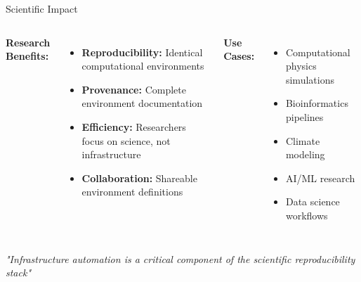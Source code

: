 \documentclass[aspectratio=169]{beamer}
\begin{document}
\begin{frame}{Scientific Impact}
  \begin{columns}
    \textbf{Research Benefits:}
    \begin{itemize}
      \item \textbf{Reproducibility:} Identical computational environments
      \item \textbf{Provenance:} Complete environment documentation
      \item \textbf{Efficiency:} Researchers focus on science, not infrastructure
      \item \textbf{Collaboration:} Shareable environment definitions
    \end{itemize}
    
    \textbf{Use Cases:}
    \begin{itemize}
      \item Computational physics simulations
      \item Bioinformatics pipelines
      \item Climate modeling
      \item AI/ML research
      \item Data science workflows
    \end{itemize}
  \end{columns}
  
  \vspace{0.3cm}
  \begin{center}
    \textit{"Infrastructure automation is a critical component of the scientific reproducibility stack"}
  \end{center}
\end{frame}
\end{document}
